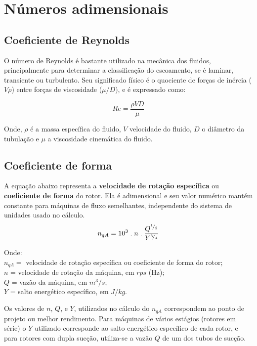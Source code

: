 \section {Números adimensionais}

\subsection{Coeficiente de Reynolds}

    O número de Reynolds é bastante utilizado na mecânica dos fluidos, principalmente para determinar a classificação do escoamento, se é laminar, transiente ou turbulento. Seu significado físico é o quociente de forças de inércia ($V \rho$) entre forças de viscosidade ($\mu/D$), e é expressado como:

    \begin{equation} \label{eq-reynolds}
        Re = \frac{\rho V D}{\mu}
    \end{equation}

    Onde, $\rho$ é a massa específica do fluido, $V$ velocidade do fluido, $D$ o diâmetro da tubulação e $\mu$ a viscosidade cinemática do fluido.

\subsection {Coeficiente de forma}

    A equação abaixo representa a \textbf{velocidade de rotação específica} ou \textbf{coeficiente de forma} do rotor. Ela é adimensional e seu valor numérico mantém constante para máquinas de fluxo semelhantes, independente do sistema de unidades usado no cálculo.
    \begin{equation} \label{eq-na}
        n_{qA} = 10^3 \; . \; n \; . \; \frac{Q^{{}^{1}\!/_{2}}}{Y^{{}^{3}\!/_{4}}}
    \end{equation}

\noindent
    Onde:  \\
    $n_{qA} =$ velocidade de rotação específica ou coeficiente de forma do rotor; \\
    $n$ = velocidade de rotação da máquina, em $rps$ (Hz); \\
    $Q$ = vazão da máquina, em $m^3/s$; \\
    $Y$ = salto energético específico, em $J/kg$.


    Os valores de $n$, $Q$, e $Y$, utilizados no cálculo do $n_{qA}$ correspondem ao ponto de projeto ou melhor rendimento. Para máquinas de vários estágios (rotores em série) o $Y$ utilizado corresponde ao salto energético específico de cada rotor, e para rotores com dupla sucção, utiliza-se a vazão $Q$ de um dos tubos de sucção.

